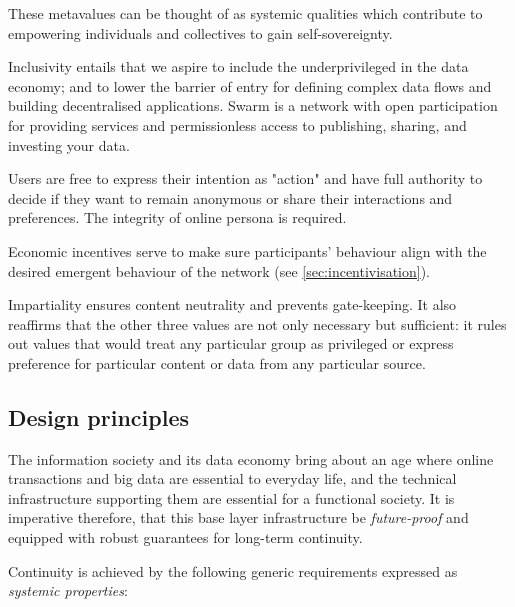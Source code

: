 These metavalues can be thought of as systemic qualities which contribute to empowering individuals and collectives to gain self-sovereignty.

Inclusivity entails that we aspire to include the underprivileged in the data economy; and to lower the barrier of entry for defining complex data flows and building decentralised applications. Swarm is a network with open participation for providing services and permissionless access to publishing, sharing, and investing your data.

Users are free to express their intention as "action" and have full authority to decide if they want to remain anonymous or share their interactions and preferences. The integrity of online persona is required. 

Economic incentives serve to make sure participants' behaviour align with the desired emergent behaviour of the network (see \ref{sec:incentivisation}). 

Impartiality ensures content neutrality and prevents gate-keeping. It also reaffirms that the other three values are not only necessary but sufficient: it rules out values that would treat any particular group as privileged or express preference for particular content or data from any particular source. 

\subsection{Design principles \statusorange}\label{sec:design-principles}
 

The information society and its data economy bring about an age where online transactions and big data are essential to everyday life, and the technical infrastructure supporting them are essential for a functional society. It is imperative therefore, that this base layer infrastructure be \emph{future-proof} and equipped with robust guarantees for long-term continuity. 

Continuity is achieved by the following generic requirements expressed as \emph{systemic properties}:

